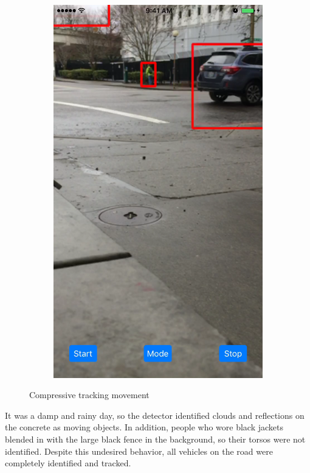 \documentclass[11pt,letterpaper]{article}
\begin{document}
\begin{figure}[h!]
\begin{subfigure}{.4\textwidth}
		\end{subfigure}\space\space\space\space%
		\begin{subfigure}{.4\textwidth}
			\centering
			\includegraphics[width=1\linewidth]{mode2b}
		\end{subfigure}
		\caption{Compressive tracking movement}
	\end{figure}

    It was a damp and rainy day, so the detector identified clouds and reflections on the concrete as moving objects. In addition, people who wore black jackets blended in with the large black fence in the background, so their torsos were not identified. Despite this undesired behavior, all vehicles on the road were completely identified and tracked.
	
\end{document}
